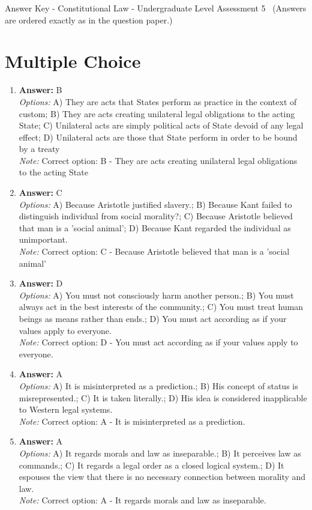 \documentclass[12pt]{article}
\begin{document}
\begin{center}
Answer Key - Constitutional Law - Undergraduate Level Assessment 5 \
\small (Answers are ordered exactly as in the question paper.)
\end{center}

\section*{Multiple Choice}
\begin{enumerate}[label=\arabic*.]
\item \textbf{Answer:} B
\\ \textit{Options:} A) They are acts that States perform as practice in the context of custom; B) They are acts creating unilateral legal obligations to the acting State; C) Unilateral acts are simply political acts of State devoid of any legal effect; D) Unilateral acts are those that State perform in order to be bound by a treaty
\\ \textit{Note:} Correct option: B - They are acts creating unilateral legal obligations to the acting State
\item \textbf{Answer:} C
\\ \textit{Options:} A) Because Aristotle justified slavery.; B) Because Kant failed to distinguish individual from social morality?; C) Because Aristotle believed that man is a 'social animal'; D) Because Kant regarded the individual as unimportant.
\\ \textit{Note:} Correct option: C - Because Aristotle believed that man is a 'social animal'
\item \textbf{Answer:} D
\\ \textit{Options:} A) You must not consciously harm another person.; B) You must always act in the best interests of the community.; C) You must treat human beings as means rather than ends.; D) You must act according as if your values apply to everyone.
\\ \textit{Note:} Correct option: D - You must act according as if your values apply to everyone.
\item \textbf{Answer:} A
\\ \textit{Options:} A) It is misinterpreted as a prediction.; B) His concept of status is misrepresented.; C) It is taken literally.; D) His idea is considered inapplicable to Western legal systems.
\\ \textit{Note:} Correct option: A - It is misinterpreted as a prediction.
\item \textbf{Answer:} A
\\ \textit{Options:} A) It regards morals and law as inseparable.; B) It perceives law as commands.; C) It regards a legal order as a closed logical system.; D) It espouses the view that there is no necessary connection between morality and law.
\\ \textit{Note:} Correct option: A - It regards morals and law as inseparable.
\end{enumerate}
\end{document}
